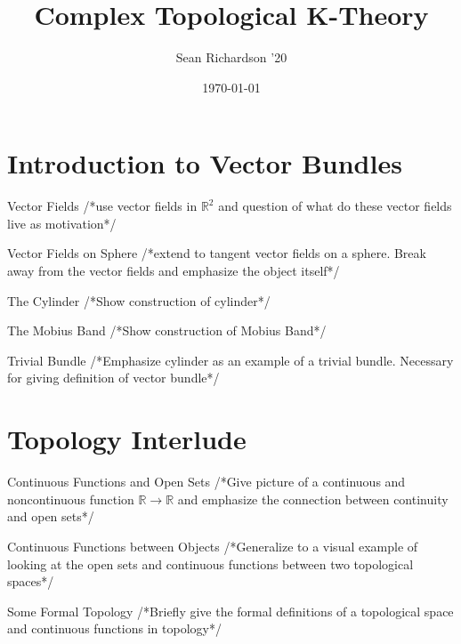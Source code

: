 \documentclass[12pt]{beamer}
\title{Complex Topological K-Theory}
\date{\today}
\author{Sean Richardson '20}
\institute{Department of Mathematical Sciences, Lewis \& Clark College}
\newcommand{\toadd}[1]{/*#1*/}
\newcommand{\R}{\mathbb{R}}
\begin{document}
\maketitle

\section{Introduction to Vector Bundles}

\begin{frame}{Vector Fields}
	\toadd{use vector fields in $\R^2$ and question of what do these vector fields live as motivation}
\end{frame}

\begin{frame}{Vector Fields on Sphere}
	\toadd{extend to tangent vector fields on a sphere. Break away from the vector fields and emphasize the object itself}
\end{frame}

\begin{frame}{The Cylinder}
	\toadd{Show construction of cylinder}
\end{frame}

\begin{frame}{The Mobius Band}
	\toadd{Show construction of Mobius Band}
\end{frame}

\begin{frame}{Trivial Bundle}
	\toadd{Emphasize cylinder as an example of a trivial bundle. Necessary for giving definition of vector bundle}
\end{frame}

\section{Topology Interlude}

\begin{frame}{Continuous Functions and Open Sets}
	\toadd{Give picture of a continuous and noncontinuous function $\R \to \R$ and emphasize the connection between continuity and open sets}
\end{frame}

\begin{frame}{Continuous Functions between Objects}
	\toadd{Generalize to a visual example of looking at the open sets and continuous functions between two topological spaces}
\end{frame}

\begin{frame}{Some Formal Topology}
	\toadd{Briefly give the formal definitions of a topological space and continuous functions in topology}
\end{frame}
\end{document}
